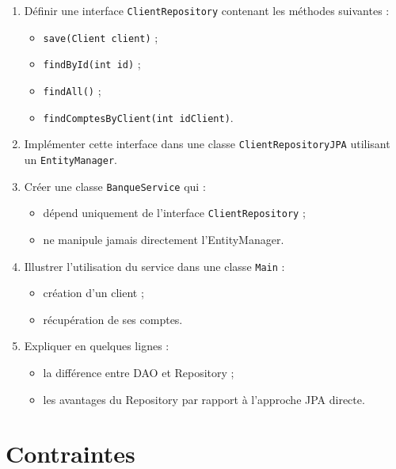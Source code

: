 \documentclass[11pt]{article}
\begin{document}
\begin{enumerate}[label=\alph*)]
    \item Définir une interface \texttt{ClientRepository} contenant les méthodes suivantes :
    \begin{itemize}
        \item \texttt{save(Client client)} ;
        \item \texttt{findById(int id)} ;
        \item \texttt{findAll()} ;
        \item \texttt{findComptesByClient(int idClient)}.
    \end{itemize}

    \item Implémenter cette interface dans une classe
    \texttt{ClientRepositoryJPA} utilisant un \texttt{EntityManager}.

    \item Créer une classe \texttt{BanqueService} qui :
    \begin{itemize}
        \item dépend uniquement de l’interface \texttt{ClientRepository} ;
        \item ne manipule jamais directement l’EntityManager.
    \end{itemize}

    \item Illustrer l’utilisation du service dans une classe \texttt{Main} :
    \begin{itemize}
        \item création d’un client ;
        \item récupération de ses comptes.
    \end{itemize}

    \item Expliquer en quelques lignes :
    \begin{itemize}
        \item la différence entre DAO et Repository ;
        \item les avantages du Repository par rapport à l’approche JPA directe.
    \end{itemize}
\end{enumerate}

\bigskip

\section*{Contraintes}
\end{document}
